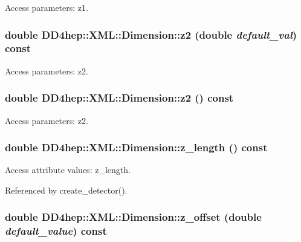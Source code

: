 Access parameters: z1. \hypertarget{struct_d_d4hep_1_1_x_m_l_1_1_dimension_a23686896013597d53d2b21faba9e9b76}{
\subsubsection[{z2}]{\setlength{\rightskip}{0pt plus 5cm}double DD4hep::XML::Dimension::z2 (double {\em default\_\-val}) const}}
\label{struct_d_d4hep_1_1_x_m_l_1_1_dimension_a23686896013597d53d2b21faba9e9b76}


Access parameters: z2. \hypertarget{struct_d_d4hep_1_1_x_m_l_1_1_dimension_a0c4e9d9d1631b541e029155e18cb5e35}{
\subsubsection[{z2}]{\setlength{\rightskip}{0pt plus 5cm}double DD4hep::XML::Dimension::z2 () const}}
\label{struct_d_d4hep_1_1_x_m_l_1_1_dimension_a0c4e9d9d1631b541e029155e18cb5e35}


Access parameters: z2. \hypertarget{struct_d_d4hep_1_1_x_m_l_1_1_dimension_aacea30f3ffad4eb1de608e953abf3769}{
\subsubsection[{z\_\-length}]{\setlength{\rightskip}{0pt plus 5cm}double DD4hep::XML::Dimension::z\_\-length () const}}
\label{struct_d_d4hep_1_1_x_m_l_1_1_dimension_aacea30f3ffad4eb1de608e953abf3769}


Access attribute values: z\_\-length. 

Referenced by create\_\-detector().\hypertarget{struct_d_d4hep_1_1_x_m_l_1_1_dimension_aeec427142a48b401c7a64694093b0b2f}{
\subsubsection[{z\_\-offset}]{\setlength{\rightskip}{0pt plus 5cm}double DD4hep::XML::Dimension::z\_\-offset (double {\em default\_\-value}) const}}
\label{struct_d_d4hep_1_1_x_m_l_1_1_dimension_aeec427142a48b401c7a64694093b0b2f}


